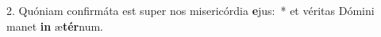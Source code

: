 2. Quóniam confirmáta est super nos misericórdia \textbf{e}jus:~*  et véritas Dómini manet \textbf{in} æ\textbf{tér}num.\


